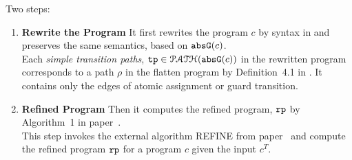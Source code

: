 Two steps:
\begin{enumerate}
    \item \textbf{Rewrite the Program}
    It first rewrites the program $c$ by syntax in \cite{GulwaniJK09} and preserves the same semantics, based on $\mathtt{abs}{\mathtt{G}}(c)$.
\\
Each \emph{simple transition paths}, $\mathtt{tp} \in \mathcal{PATH}(\mathtt{abs}{\mathtt{G}}(c))$ in the rewritten program
corresponds to a path $\rho$ in the flatten program by Definition~4.1 in \cite{GulwaniJK09}.
%
It contains only the edges of atomic assignment or guard transition.
\item \textbf{Refined Program}
Then it computes the 
refined program, $\mathtt{rp}$ by Algorithm~1 in paper~\cite{GulwaniJK09}.
\\
This step invokes the external algorithm REFINE from paper~\cite{GulwaniJK09} and compute the 
refined program $\mathtt{rp}$ for a program $c$ given the input $c^{T}$.
\end{enumerate}

